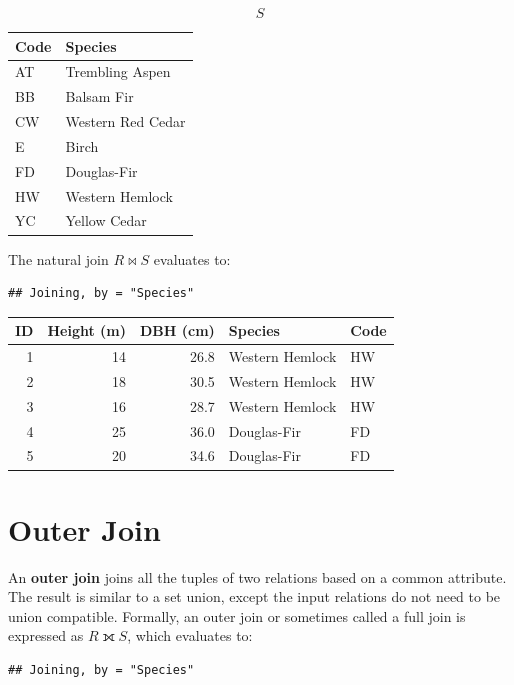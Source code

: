 \documentclass[
]{book}
\begin{document}
\[S\]

\begin{tabular}{ll}
\toprule
Code & Species\\
\midrule
AT & Trembling Aspen\\
BB & Balsam Fir\\
CW & Western Red Cedar\\
E & Birch\\
FD & Douglas-Fir\\
\addlinespace
HW & Western Hemlock\\
YC & Yellow Cedar\\
\bottomrule
\end{tabular}

The natural join \(R⋈S\) evaluates to:

\begin{verbatim}
## Joining, by = "Species"
\end{verbatim}

\begin{tabular}{rrrll}
\toprule
ID & Height (m) & DBH (cm) & Species & Code\\
\midrule
1 & 14 & 26.8 & Western Hemlock & HW\\
2 & 18 & 30.5 & Western Hemlock & HW\\
3 & 16 & 28.7 & Western Hemlock & HW\\
4 & 25 & 36.0 & Douglas-Fir & FD\\
5 & 20 & 34.6 & Douglas-Fir & FD\\
\bottomrule
\end{tabular}

\hypertarget{outer-join}{%
\section{Outer Join}\label{outer-join}}

An \textbf{outer join} joins all the tuples of two relations based on a common attribute. The result is similar to a set union, except the input relations do not need to be union compatible. Formally, an outer join or sometimes called a full join is expressed as \(R⟗S\), which evaluates to:

\begin{verbatim}
## Joining, by = "Species"
\end{verbatim}
\end{document}
